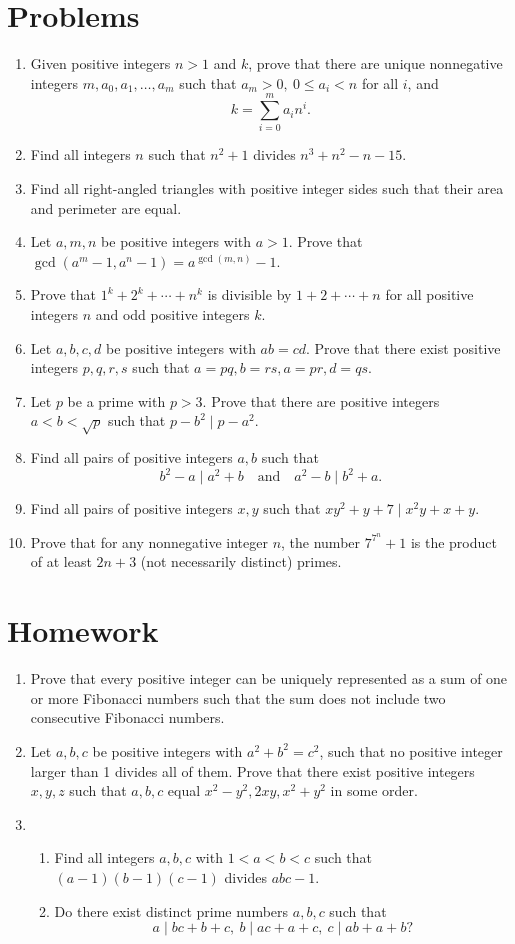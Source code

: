 \documentclass{article}
\begin{document}
\section{Problems}
  \begin{enumerate}
    \item Given positive integers $n>1$ and $k$, prove that there are unique
      nonnegative integers $m,a_0,a_1,\ldots,a_m$ such that $a_m>0,\ 0\le
      a_i<n$ for all $i$, and
      \[k=\sum_{i=0}^m a_i n^i.\]
    \item Find all integers $n$ such that $n^2+1$ divides $n^3+n^2-n-15$.
    \item Find all right-angled triangles with positive integer sides 
      such that their area and perimeter are equal.
    \item Let $a,m,n$ be positive integers with $a>1$.
      Prove that $\gcd(a^m-1,a^n-1)=a^{\gcd(m,n)}-1$.
    \item Prove that $1^k+2^k+\cdots+n^k$ is divisible by $1+2+\cdots+n$ for
      all positive integers $n$ and odd positive integers $k$.
    \item Let $a,b,c,d$ be positive integers with $ab=cd$. Prove that there
      exist positive integers $p,q,r,s$ such that \(a=pq,b=rs,a=pr,d=qs\).
    \item Let $p$ be a prime with $p>3$. Prove that there are positive integers
      $a<b<\sqrt p$ such that $p-b^2\mid p-a^2$.
    \item Find all pairs of positive integers $a,b$ such that \[b^2-a\mid
        a^2+b\quad\text{and}\quad a^2-b\mid b^2+a.\]
    \item Find all pairs of positive integers $x,y$ such that $xy^2+y+7\mid
      x^2y+x+y$.
    \item Prove that for any nonnegative integer $n$, the number $7^{7^n}+1$ is
      the product of at least $2n+3$ (not necessarily distinct) primes.
  \end{enumerate}
\newpage
\section{Homework}
  \begin{enumerate}
    \item Prove that every positive integer can be uniquely represented as a sum
      of one or more Fibonacci numbers such that the sum does not include two
      consecutive Fibonacci numbers.
    \item Let $a, b, c$ be positive integers with $a^2+b^2=c^2$, such that no
      positive integer larger than 1 divides all of them. Prove that
      there exist positive integers $x,y,z$ such that $a,b,c$ equal
      $x^2-y^2,2xy,x^2+y^2$ in some order.
    \item
      \begin{enumerate}
        \item Find all integers $a,b,c$ with $1<a<b<c$ such that $(a-1)(b-1)(c-1)$
          divides $abc-1$.
        \item Do there exist distinct prime numbers $a,b,c$ such that
          \[a\mid bc+b+c,\ b\mid ac+a+c,\ c\mid ab+a+b?\]
      \end{enumerate}
  \end{enumerate}
\end{document}
